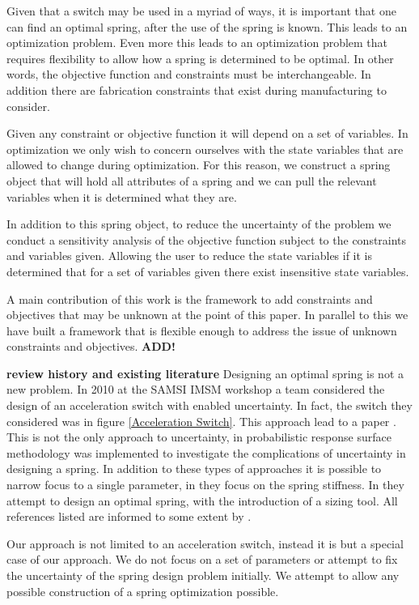 \documentclass[10pt]{article}
\begin{document}
Given that a switch may be used in a myriad of ways, it is important that one can find an optimal spring, after the use of the spring is known. This leads to an optimization problem. Even more this leads to an optimization problem that requires flexibility to allow how a spring is determined to be optimal. In other words, the objective function and constraints must be interchangeable. In addition there are fabrication constraints that exist during manufacturing to consider.  

Given any constraint or objective function it will depend on a set of variables. In optimization we only wish to concern ourselves with the state variables that are allowed to change during optimization. For this reason, we construct a spring object that will hold all attributes of a spring and we can pull the relevant variables when it is determined what they are. 

In addition to this spring object, to reduce the uncertainty of the problem we conduct a sensitivity analysis of the objective function subject to the constraints and variables given. Allowing the user to reduce the state variables if it is determined that for a set of variables given there exist insensitive state variables. 

A main contribution of this work is the framework to add constraints and objectives that may be unknown at the point of this paper. In parallel to this we have built a framework that is flexible enough to address the issue of unknown constraints and objectives. \textbf{ADD!}


\textbf{review history and existing literature}
Designing an optimal spring is not a new problem. In 2010 at the SAMSI IMSM workshop a team considered the design of an acceleration switch with enabled uncertainty. In fact, the switch they considered was in figure \ref{Acceleration Switch}. This approach lead to a paper \cite{IMSM2010}. This is not the only approach to uncertainty, in \cite{Reliability} probabilistic response surface methodology was implemented to investigate the complications of uncertainty in designing a spring. In addition to these types of approaches it is possible to narrow focus to a single parameter, in \cite{Robust} they focus on the spring stiffness. In \cite{Paredes} they attempt to design an optimal spring, with the introduction of a sizing tool. All references listed are informed to some extent by \cite{Wahl}. 

Our approach is not limited to an acceleration switch, instead it is but a special case of our approach. We do not focus on a set of parameters or attempt to fix the uncertainty of the spring design problem initially. We attempt to allow any possible construction of a spring optimization possible. 
\end{document}
